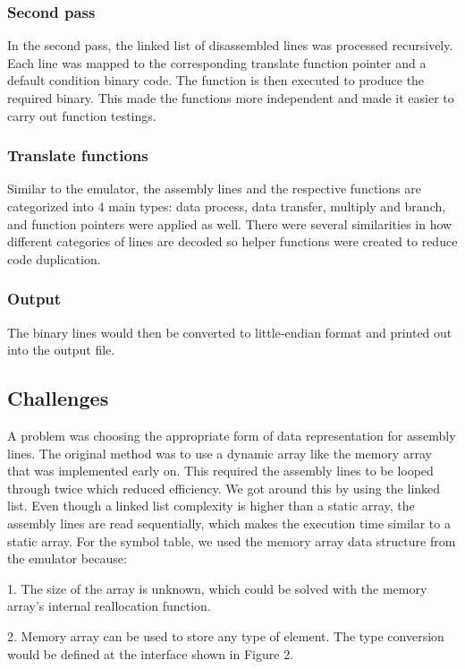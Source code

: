 \documentclass[10pt]{article}
\begin{document}
\subsubsection{Second pass}
In the second pass, the linked list of disassembled lines was processed recursively. Each line was mapped to the corresponding translate function pointer and a default condition binary code. The function is then executed to produce the required binary. This made the functions more independent and made it easier to carry out function testings.
    
\subsubsection{Translate functions}
Similar to the emulator, the assembly lines and the respective functions are categorized into 4 main types: data process, data transfer, multiply and branch, and function pointers were applied as well.  There were several similarities in how different categories of lines are decoded so helper functions were created to reduce code duplication.

\subsubsection{Output}
The binary lines would then be converted to little-endian format and printed out into the output file.

\subsection{Challenges}
A problem was choosing the appropriate form of data representation for assembly lines. The original method was to use a dynamic array like the memory array that was implemented early on. This required the assembly lines to be looped through twice which reduced efficiency. We got around this by using the linked list. Even though a linked list complexity is higher than a static array, the assembly lines are read sequentially, which makes the execution time similar to a static array.\newline
For the symbol table, we used the memory array data structure from the emulator because:
    
1. The size of the array is unknown, which could be solved with the memory array's internal reallocation function.
    
2. Memory array can be used to store any type of element. The type conversion would be defined at the interface shown in Figure 2.
\pagebreak
\end{document}

